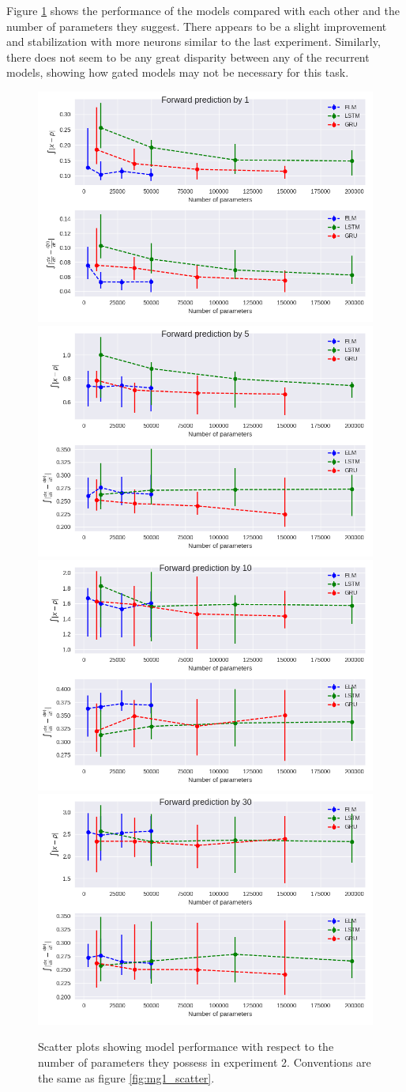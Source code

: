 \documentclass[11pt]{article}
\begin{document}
Figure \ref{fig:mg2_scatter} shows the performance of the models
compared with each other and the number of parameters they
suggest. There appears to be a slight improvement and stabilization
with more neurons similar to the last experiment. Similarly, there
does not seem to be any great disparity between any of the recurrent
models, showing how gated models may not be necessary for this task.

  \begin{figure}
    \begin{center}
  \includegraphics[width=.48\textwidth]{figures/mg2_scatter_1.png}
  \includegraphics[width=.48\textwidth]{figures/mg2_scatter_5.png}
  \includegraphics[width=.48\textwidth]{figures/mg2_scatter_10.png}
  \includegraphics[width=.48\textwidth]{figures/mg2_scatter_30.png}
       
    \caption{Scatter plots showing model performance with respect to
      the number of parameters they possess in experiment 2. Conventions are the same as figure \ref{fig:mg1_scatter}.}
    \label{fig:mg2_scatter}
    \end{center}
  \end{figure}
\end{document}
